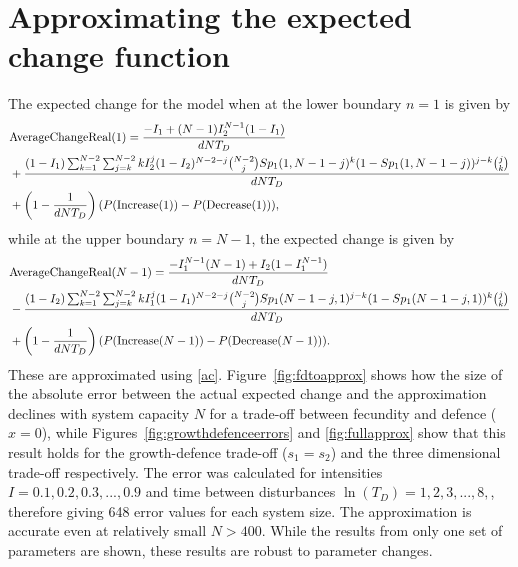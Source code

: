 \documentclass[preprint,10pt,reqno]{report}
\begin{document}
 \section{Approximating the expected change function}
 \label{appapproximations}
 The expected change for the model when at the lower boundary $n=1$ is given by
 \begin{align}
\label{acreal1difi}&\text{AverageChangeReal}(1)=\frac{-I_1+(N-1)I_2^{N-1}(1-I_1)}{dNT_D}\\
&+\frac{(1-I_1)\sum_{k=1}^{N-2}\sum_{j=k}^{N-2}k I_2^j(1-I_2)^{N-2-j}{N-2\choose j} Sp_1(1,N-1-j)^k(1-Sp_1(1,N-1-j))^{j-k} {j \choose k}}{dNT_D} \notag \\
 &+ \left(1-\frac{1}{dNT_D}\right)(P(\text{Increase}(1))-P(\text{Decrease}(1))), \notag
 \end{align}
 while at the upper boundary $n=N-1$, the expected change is given by
\begin{align}
 \label{acrealtotdifi}&\text{AverageChangeReal}(N-1)= \frac{-I_1^{N-1}(N-1) +I_2(1-I_1^{N-1})}{dNT_D} \\
 &-\frac{(1-I_2)\sum_{k=1}^{N-2}\sum_{j=k}^{N-2}k I_1^j(1-I_1)^{N-2-j}{N-2\choose j} Sp_1(N-1-j,1)^{j-k}(1-Sp_1(N-1-j,1))^{k} {j \choose k}}{dNT_D} \notag \\
 &+ \left(1-\frac{1}{dNT_D}\right)(P(\text{Increase}(N-1))-P(\text{Decrease}(N-1))). \notag
  \end{align} 
These are approximated using \eqref{ac}. Figure~\ref{fig:fdtoapprox} shows how the size of the absolute error between the actual expected change and the approximation declines with system capacity $N$ for a trade-off between fecundity and defence ($x=0$), while Figures~\ref{fig:growthdefenceerrors} and \ref{fig:fullapprox} show that this result holds for the growth-defence trade-off ($s_1=s_2$) and the three dimensional trade-off respectively. The error was calculated for intensities $I=0.1,0.2,0.3,...,0.9$ and time between disturbances $\ln(T_D)=1,2,3,...,8,$, therefore giving 648 error values for each system size. The approximation is accurate even at relatively small $N>400$. While the results from only one set of parameters are shown, these results are robust to parameter changes.

   
   
\end{document}
